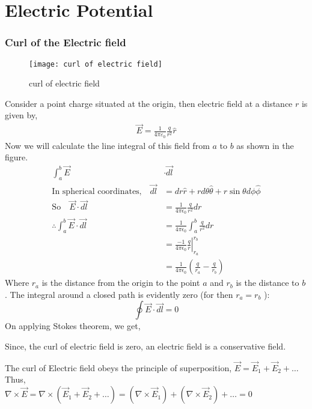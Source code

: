 \chapter{Electric Potential}
\subsection{Curl of the Electric field}
\begin{wrapfigure}{r}{0.35\textwidth}
	\begin{center}
		\texttt{[image: curl of electric field]}
	\end{center}
	\caption{curl of electric field}
\end{wrapfigure}

Consider a point charge situated at the origin, then electric field at a distance $r$ is given by,
\begin{align*}
\vec{E}=\frac{1}{4 \pi \varepsilon_{0}} \frac{q}{r^{2}} \hat{r}
\end{align*}
Now we will calculate the line integral of this field from  $a$ to $b$ as shown in the figure.
\begin{align*}
\int_{{a}}^{{b}} \vec{E}& \cdot \vec{d {l}} \\
\text{In spherical coordinates,} \quad \vec{d {l}}&=d r \hat{{r}}+r d \theta \hat{{\theta}}+r \sin \theta d \phi \hat{{\phi}}\\ 
\text{So}\quad
\vec{E} \cdot \vec{d {l}}&=\frac{1}{4 \pi \epsilon_{0}} \frac{q}{r^{2}} d r\\
\therefore \int_{{a}}^{{b}} \vec{E} \cdot \vec{d {l}}&=\frac{1}{4 \pi \epsilon_{0}} \int_{{a}}^{{b}} \frac{q}{r^{2}} d r\\&=\left.\frac{-1}{4 \pi \epsilon_{0}} \frac{q}{r}\right|_{r_{a}} ^{r_{b}}\\&=\frac{1}{4 \pi \epsilon_{0}}\left(\frac{q}{r_{a}}-\frac{q}{r_{b}}\right)
\end{align*}
Where $r_{a}$ is the distance from the origin to the point ${a}$ and $r_{b}$ is the distance to ${b}$. The integral around a closed path is evidently zero (for then $r_{a}=r_{b}$ ):
$$
\oint \vec{E} \cdot \vec{d {l}}=0
$$
On applying Stokes theorem, we get, 
\begin{center}
\end{center}
Since, the curl of electric field is zero, an electric field is a conservative field.
\begin{note}
	The curl of Electric field obeys the principle of superposition,
	$\vec{E}=\vec{E}_{1}+\vec{E}_{2}+\ldots$\\Thus,\\
	$\nabla \times \vec{E}=\nabla \times\left(\vec{E}_{1}+\vec{E}_{2}+\ldots\right)=\left(\nabla \times \vec{E}_{1}\right)+\left(\nabla \times \vec{E}_{2}\right)+\ldots=0$
\end{note}
